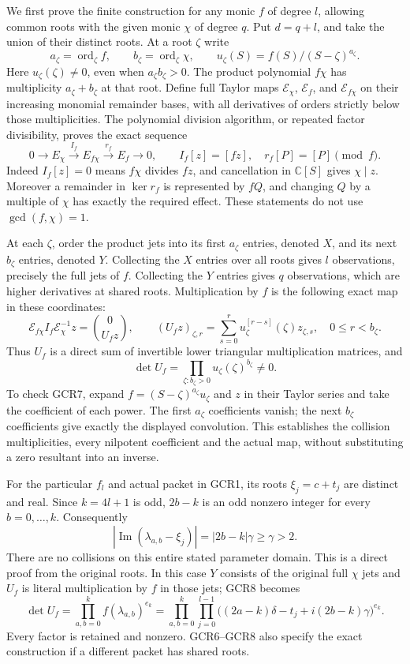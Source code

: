 \documentclass[11pt,a4paper]{article}
\begin{document}
We first prove the finite construction for any monic $f$ of degree
$l$, allowing common roots with the given monic $\chi$ of degree
$q$. Put $d=q+l$, and take the union of their distinct roots.
At a root $\zeta$ write
\[
 a_\zeta=\operatorname{ord}_\zeta f,\qquad
 b_\zeta=\operatorname{ord}_\zeta\chi,\qquad
 u_\zeta(S)=f(S)/(S-\zeta)^{a_\zeta}.
\]
Here $u_\zeta(\zeta)\ne0$, even when $a_\zeta b_\zeta>0$.
The product polynomial $f\chi$ has multiplicity
$a_\zeta+b_\zeta$ at that root. Define full Taylor maps
$\mathcal E_\chi$, $\mathcal E_f$, and $\mathcal E_{f\chi}$ on
their increasing monomial remainder bases, with all derivatives
of orders strictly below those multiplicities. The polynomial
division algorithm, or repeated factor divisibility, proves the
exact sequence
\[
 0\longrightarrow E_\chi
   \xrightarrow{\ I_f\ }E_{f\chi}
   \xrightarrow{\ r_f\ }E_f\longrightarrow0,\qquad
 I_f[z]=[fz],\quad r_f[P]=[P]\pmod f.
\tag{GCR6}
\]
Indeed $I_f[z]=0$ means $f\chi$ divides $fz$, and cancellation
in $\mathbb C[S]$ gives $\chi\mid z$. Moreover a remainder in
$\ker r_f$ is represented by $fQ$, and changing $Q$ by a multiple
of $\chi$ has exactly the required effect. These statements do
not use $\gcd(f,\chi)=1$.

At each $\zeta$, order the product jets into its first $a_\zeta$
entries, denoted $X$, and its next $b_\zeta$ entries, denoted $Y$.
Collecting the $X$ entries over all roots gives $l$ observations,
precisely the full jets of $f$. Collecting the $Y$ entries gives
$q$ observations, which are higher derivatives at shared roots.
Multiplication by $f$ is the following exact map in these coordinates:
\[
 \mathcal E_{f\chi}I_f\mathcal E_\chi^{-1}z
       =\binom{0}{U_fz},\qquad
 (U_fz)_{\zeta,r}
       =\sum_{s=0}^r u_\zeta^{[r-s]}(\zeta)z_{\zeta,s},
 \quad 0\leq r<b_\zeta.
\tag{GCR7}
\]
Thus $U_f$ is a direct sum of invertible lower triangular
multiplication matrices, and
\[
 \det U_f=\prod_{\zeta:b_\zeta>0}
                          u_\zeta(\zeta)^{b_\zeta}\ne0.
\tag{GCR8}
\]
To check GCR7, expand $f=(S-\zeta)^{a_\zeta}u_\zeta$ and $z$
in their Taylor series and take the coefficient of each power.
The first $a_\zeta$ coefficients vanish; the next $b_\zeta$
coefficients give exactly the displayed convolution. This
establishes the collision multiplicities, every nilpotent
coefficient and the actual map, without substituting a zero
resultant into an inverse.

For the particular $f_l$ and actual packet in GCR1, its roots
$\xi_j=c+t_j$ are distinct and real. Since $k=4l+1$ is odd,
$2b-k$ is an odd nonzero integer for every $b=0,\ldots,k$.
Consequently
\[
 |\operatorname{Im}(\lambda_{a,b}-\xi_j)|
       =|2b-k|\gamma\geq\gamma>2.
\tag{GCR9}
\]
There are no collisions on this entire stated parameter domain.
This is a direct proof from the original roots. In this case
$Y$ consists of the original full $\chi$ jets and
$U_f$ is literal multiplication by $f$ in those jets; GCR8 becomes
\[
 \det U_f=\prod_{a,b=0}^k f(\lambda_{a,b})^{e_k}
 =\prod_{a,b=0}^k\prod_{j=0}^{l-1}
       \big((2a-k)\delta-t_j+i(2b-k)\gamma\big)^{e_k}.
\tag{GCR10}
\]
Every factor is retained and nonzero. GCR6--GCR8 also specify
the exact construction if a different packet has shared roots.
\end{document}
